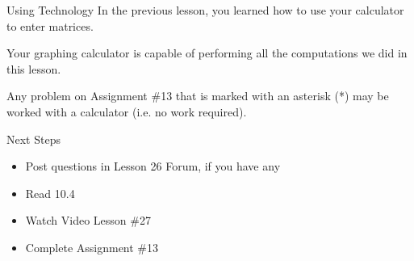 \documentclass[t]{beamer}
\begin{document}
	\begin{frame}{Using Technology}
		In the previous lesson, you learned how to use your calculator to enter matrices. \pause
		
		Your graphing calculator is capable of performing all the computations we did in this lesson. \pause
		
		Any problem on Assignment \#13 that is marked with an asterisk (*) may be worked with a calculator (i.e. no work required).
	\end{frame}

	\begin{frame}{Next Steps}
		\begin{itemize}
			\item Post questions in Lesson 26 Forum, if you have any
			\item Read 10.4
			\item Watch Video Lesson \#27
			\item Complete Assignment \#13
		\end{itemize}
	\end{frame}
	
\end{document}
